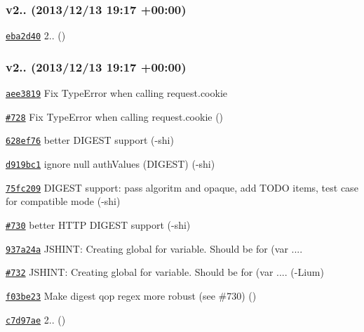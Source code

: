 \subsubsection*{v2.. (2013/12/13 19\+:17 +00\+:00)}


\begin{DoxyItemize}
\item \href{https://github.com/mikeal/request/commit/eba2d402fcdcf1ac878de8672b1c9f5da856dcc1}{\tt eba2d40} 2.. ()
\end{DoxyItemize}

\subsubsection*{v2.. (2013/12/13 19\+:17 +00\+:00)}


\begin{DoxyItemize}
\item \href{https://github.com/mikeal/request/commit/aee38191557574ef570fd9c764af0af7072cc92a}{\tt aee3819} Fix Type\+Error when calling request.\+cookie
\item \href{https://github.com/mikeal/request/pull/728}{\tt \#728} Fix Type\+Error when calling request.\+cookie ()
\item \href{https://github.com/mikeal/request/commit/628ef768b1f52710b8eb4e14be4db69d174d1dcb}{\tt 628ef76} better D\+I\+G\+E\+S\+T support (-\/shi)
\item \href{https://github.com/mikeal/request/commit/d919bc1ce97fa461c365437a0c739bbaa6b86de7}{\tt d919bc1} ignore null auth\+Values (D\+I\+G\+E\+S\+T) (-\/shi)
\item \href{https://github.com/mikeal/request/commit/75fc209c5a9e6c647a04e42048c30f46c66fc103}{\tt 75fc209} D\+I\+G\+E\+S\+T support\+: pass algoritm and opaque, add T\+O\+D\+O items, test case for compatible mode (-\/shi)
\item \href{https://github.com/mikeal/request/pull/730}{\tt \#730} better H\+T\+T\+P D\+I\+G\+E\+S\+T support (-\/shi)
\item \href{https://github.com/mikeal/request/commit/937a24a168a126f406ee8eb55eb78169ddc53497}{\tt 937a24a} J\+S\+H\+I\+N\+T\+: Creating global \textquotesingle{}for\textquotesingle{} variable. Should be \textquotesingle{}for (var ...\textquotesingle{}.
\item \href{https://github.com/mikeal/request/pull/732}{\tt \#732} J\+S\+H\+I\+N\+T\+: Creating global \textquotesingle{}for\textquotesingle{} variable. Should be \textquotesingle{}for (var ...\textquotesingle{}. (-\/\+Lium)
\item \href{https://github.com/mikeal/request/commit/f03be2309bd85a89d2e3c208b2fb4be1a2b95c79}{\tt f03be23} Make digest qop regex more robust (see \#730) ()
\item \href{https://github.com/mikeal/request/commit/c7d97aefaebf773ce62c72e9ec656f0250b7a1e7}{\tt c7d97ae} 2.. ()
\end{DoxyItemize}

